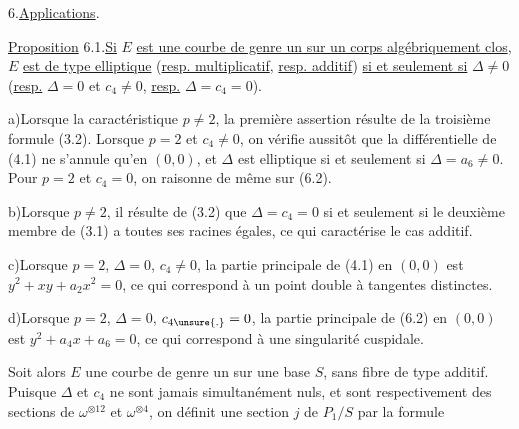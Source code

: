 6.\qquad \uline{Applications}.

\uline{Proposition} 6.1.\qquad \uline{Si} $E$ \uline{est une courbe de genre un sur un corps algébriquement clos}, $E$ \uline{est de type elliptique} (\uline{resp. multiplicatif}, \uline{resp. additif}) \uline{si et seulement si} $\Delta\ne0$ (\uline{resp.} $\Delta=0$ et $c_4\ne0$, \uline{resp.} $\Delta=c_4=0$).

a)\qquad Lorsque la caractéristique $p\ne2$, la première assertion résulte de la troisième formule (3.2). Lorsque $p=2$ et $c_4\ne0$, on vérifie aussitôt que la différentielle de (4.1) ne s'annule qu'en $(0,0)$, et $\Delta$ est elliptique si et seulement si $\Delta=a_6\ne0$. Pour $p=2$ et $c_4=0$, on raisonne de même sur (6.2).

b)\qquad Lorsque $p\ne2$, il résulte de (3.2) que $\Delta=c_4=0$ si et seulement si le deuxième membre de (3.1) a toutes ses racines égales, ce qui caractérise le cas additif.

c)\qquad Lorsque $p=2$, $\Delta=0$, $c_4\ne0$, la partie principale de (4.1) en $(0,0)$ est $y^2+xy+a_2x^2=0$, ce qui correspond à un point double à tangentes distinctes.

d)\qquad Lorsque $p=2$, $\Delta=0$, $c_{4\unsure{.}}=0$, la partie principale de (6.2) en $(0,0)$ est $y^2+a_4x+a_6=0$, ce qui correspond à une singularité cuspidale.

Soit alors $E$ une courbe de genre un sur une base $S$, sans fibre de type additif. Puisque $\Delta$ et $c_4$ ne sont jamais simultanément nuls, et sont respectivement des sections de $\omega^{\otimes12}$ et $\omega^{\otimes4}$, on définit une section $j$ de $P_1/S$ par la formule
